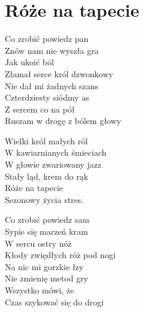 \section{Róże na tapecie}
\begin{text}
Co zrobić powiedz pan\\
Znów nam nie wyszła gra\\
Jak ukoić ból\\
Złamał serce król dzwonkowy\\
Nie dał mi żadnych szans\\
Czterdziesty siódmy as\\
Z sercem co na pół\\
Ruszam w drogę z bólem głowy

\vin Wielki król małych ról\\
\vin W kawiarnianych śmieciach\\
\vin W głowie zwariowany jazz\\
\vin Stały ląd, krem do rąk\\
\vin Róże na tapecie\\
\vin Sezonowy życia stres.

Co zrobić powiedz sam\\
Sypie się marzeń kram\\
W sercu ostry nóż\\
Kłody zwiędłych róż pod nogi\\
Na nic mi gorzkie łzy\\
Nie zmienię metod gry \\
Wszystko mówi, że\\
Czas szykować się do drogi 
\end{text}
